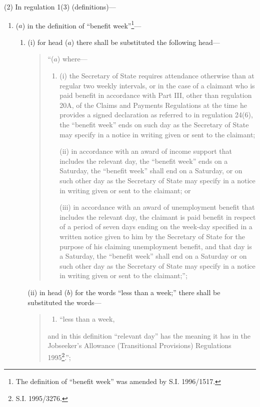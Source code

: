 \documentclass[12pt,a4paper]{article}
\begin{document}
(2) In regulation 1(3) (definitions)—
\begin{enumerate}\item[]
($a$) in the definition of “benefit week”\footnote{\frenchspacing The definition of “benefit week” was amended by S.I. 1996/1517.}—
\begin{enumerate}\item[]
(i) for head ($a$) there shall be substituted the following head—
\begin{quotation}
“($a$) where—
\begin{enumerate}\item[]
(i) the Secretary of State requires attendance otherwise than at regular two weekly intervals, or in the case of a claimant who is paid benefit in accordance with Part III, other than regulation 20A, of the Claims and Payments Regulations at the time he provides a signed declaration as referred to in regulation 24(6), the “benefit week” ends on such day as the Secretary of State may specify in a notice in writing given or sent to the claimant;

(ii) in accordance with an award of income support that includes the relevant day, the “benefit week” ends on a Saturday, the “benefit week” shall end on a Saturday, or on such other day as the Secretary of State may specify in a notice in writing given or sent to the claimant; or

(iii) in accordance with an award of unemployment benefit that includes the relevant day, the claimant is paid benefit in respect of a period of seven days ending on the week-day specified in a written notice given to him by the Secretary of State for the purpose of his claiming unemployment benefit, and that day is a Saturday, the “benefit week” shall end on a Saturday or on such other day as the Secretary of State may specify in a notice in writing given or sent to the claimant;”;
\end{enumerate}
\end{quotation}

(ii) in head ($b$) for the words “less than a week;” there shall be substituted the words—
\begin{quotation}
\begin{enumerate}\item[]
“less than a week,
\end{enumerate}\noindent
and in this definition “relevant day” has the meaning it has in the Jobseeker’s Allowance (Transitional Provisions) Regulations 1995\footnote{\frenchspacing S.I. 1995/3276.}.”;
\end{quotation}
\end{enumerate}


\end{enumerate}
\end{document}
